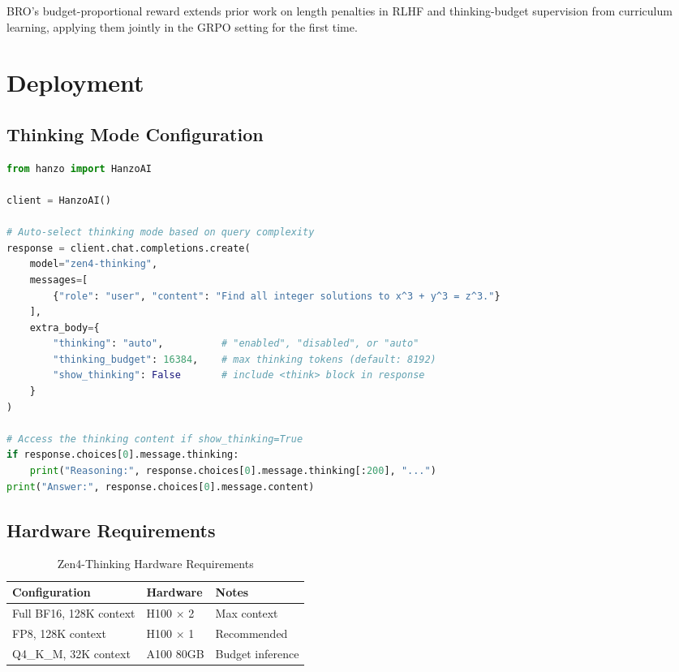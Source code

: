 \documentclass[11pt,a4paper]{article}
\begin{document}
BRO's budget-proportional reward extends prior work on length penalties in RLHF
\cite{singhal2023long} and thinking-budget supervision from curriculum learning, applying
them jointly in the GRPO setting for the first time.

\section{Deployment}

\subsection{Thinking Mode Configuration}

\begin{lstlisting}[language=Python, caption=Zen4-Thinking Extended Reasoning]
from hanzo import HanzoAI

client = HanzoAI()

# Auto-select thinking mode based on query complexity
response = client.chat.completions.create(
    model="zen4-thinking",
    messages=[
        {"role": "user", "content": "Find all integer solutions to x^3 + y^3 = z^3."}
    ],
    extra_body={
        "thinking": "auto",          # "enabled", "disabled", or "auto"
        "thinking_budget": 16384,    # max thinking tokens (default: 8192)
        "show_thinking": False       # include <think> block in response
    }
)

# Access the thinking content if show_thinking=True
if response.choices[0].message.thinking:
    print("Reasoning:", response.choices[0].message.thinking[:200], "...")
print("Answer:", response.choices[0].message.content)
\end{lstlisting}

\subsection{Hardware Requirements}

\begin{table}[H]
\centering
\begin{tabular}{lll}
\toprule
\textbf{Configuration} & \textbf{Hardware} & \textbf{Notes} \\
\midrule
Full BF16, 128K context & H100 $\times$ 2 & Max context \\
FP8, 128K context       & H100 $\times$ 1 & Recommended \\
Q4\_K\_M, 32K context   & A100 80GB       & Budget inference \\
\bottomrule
\end{tabular}
\caption{Zen4-Thinking Hardware Requirements}
\end{table}
\end{document}
